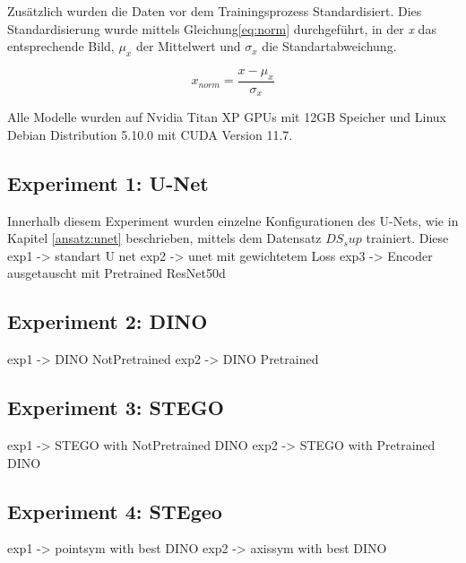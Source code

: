 	Zusätzlich wurden die Daten vor dem Trainingsprozess Standardisiert. 
	Dies Standardisierung wurde mittels Gleichung\ref{eq:norm} durchgeführt, in der 
	\textit{x} das entsprechende Bild,  $\mu_{ x }$ der Mittelwert  und $\sigma_{x}$ die Standartabweichung. 
	
	\begin{equation}
		x_{ norm } = \frac{ x - \mu_{ x }}{ \sigma _{x}}
		\label{eq:norm}
	\end{equation}


	Alle Modelle wurden auf Nvidia Titan XP GPUs mit 12GB Speicher und Linux Debian Distribution 5.10.0 mit CUDA Version 11.7. 
\subsection{Experiment 1: U-Net}
	
	Innerhalb diesem Experiment wurden einzelne Konfigurationen des U-Nets, wie in Kapitel \ref{ansatz:unet} beschrieben, mittels dem Datensatz $DS_sup$ trainiert. Diese 
	exp1 -> standart U net
	exp2 -> unet mit gewichtetem Loss
	exp3 -> Encoder ausgetauscht mit Pretrained ResNet50d

\subsection{Experiment 2: DINO}
	exp1 -> DINO NotPretrained
	exp2 -> DINO Pretrained
\subsection{Experiment 3: STEGO}
	exp1 -> STEGO with NotPretrained DINO
	exp2 -> STEGO with Pretrained DINO
\subsection{Experiment 4: STEgeo}
	exp1 -> pointsym with best DINO
	exp2 -> axissym with best DINO